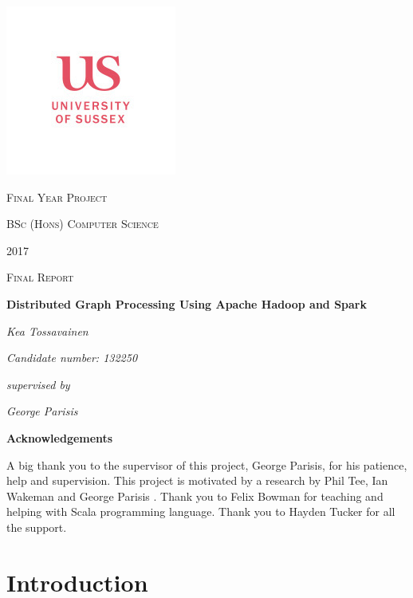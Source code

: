 \documentclass{article}
\theoremstyle{definition}
\begin{document}


\begin{titlepage}
	\centering
	\includegraphics{sussex} \par
	{\scshape\Large Final Year Project \par}
	{\Large\scshape BSc (Hons) Computer Science\par}
	{\Large\scshape 2017\par}
	{\scshape\Large Final Report\par}
	\vspace{1cm}
	{\huge\bfseries Distributed Graph Processing Using Apache Hadoop and Spark\par}
	\vspace{1cm}
	{\Large\itshape Kea Tossavainen \par}
	{\Large\itshape Candidate number: 132250\par}
	\vfill
	{\Large\itshape supervised by\par}
	{\Large\itshape George Parisis\par}

	\vfill
\end{titlepage}

\begin{titlepage}
	\bigskip
	\centering
	\vspace{5cm}
{\par\large\bfseries Acknowledgements}
A big thank you to the supervisor of this project, George Parisis, for his patience, help and supervision. This project is motivated by a research by Phil Tee, Ian Wakeman and George Parisis \cite{Tee2016b}. Thank you to Felix Bowman for teaching and helping with Scala programming language. Thank you to Hayden Tucker for all the support. \\ 
\end{titlepage}

\tableofcontents

\newpage
\section{Introduction}
\end{document}
